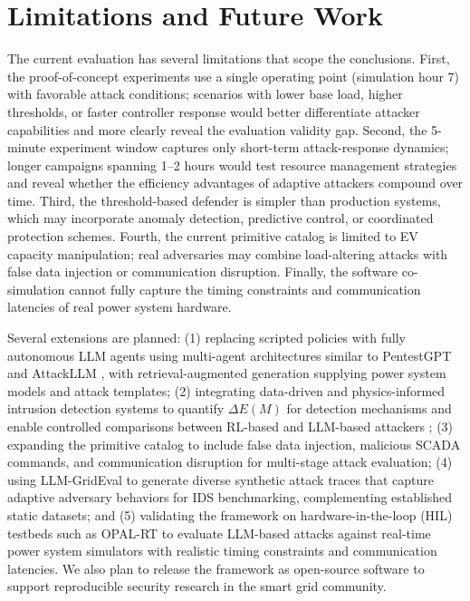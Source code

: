 \section{Limitations and Future Work}

The current evaluation has several limitations that scope the conclusions. First, the proof-of-concept experiments use a single operating point (simulation hour 7) with favorable attack conditions; scenarios with lower base load, higher thresholds, or faster controller response would better differentiate attacker capabilities and more clearly reveal the evaluation validity gap. Second, the 5-minute experiment window captures only short-term attack-response dynamics; longer campaigns spanning 1--2 hours would test resource management strategies and reveal whether the efficiency advantages of adaptive attackers compound over time. Third, the threshold-based defender is simpler than production systems, which may incorporate anomaly detection, predictive control, or coordinated protection schemes. Fourth, the current primitive catalog is limited to EV capacity manipulation; real adversaries may combine load-altering attacks with false data injection or communication disruption. Finally, the software co-simulation cannot fully capture the timing constraints and communication latencies of real power system hardware.

Several extensions are planned: (1) replacing scripted policies with fully autonomous LLM agents using multi-agent architectures similar to PentestGPT and AttackLLM \cite{deng2024pentestgpt,attackllm}, with retrieval-augmented generation supplying power system models and attack templates; (2) integrating data-driven and physics-informed intrusion detection systems to quantify $\Delta E(M)$ for detection mechanisms and enable controlled comparisons between RL-based and LLM-based attackers \cite{aoufi2020fdiasurvey,sahani2023smartgridids}; (3) expanding the primitive catalog to include false data injection, malicious SCADA commands, and communication disruption for multi-stage attack evaluation; (4) using LLM-GridEval to generate diverse synthetic attack traces that capture adaptive adversary behaviors for IDS benchmarking, complementing established static datasets; and (5) validating the framework on hardware-in-the-loop (HIL) testbeds such as OPAL-RT to evaluate LLM-based attacks against real-time power system simulators with realistic timing constraints and communication latencies. We also plan to release the framework as open-source software to support reproducible security research in the smart grid community.

